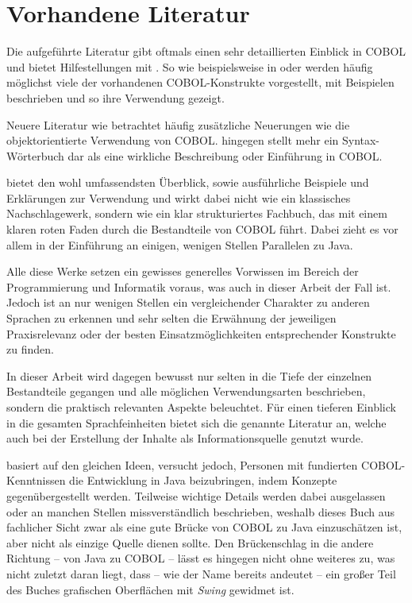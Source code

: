\section{Vorhandene Literatur}
Die aufgeführte Literatur gibt oftmals einen sehr detaillierten Einblick in COBOL und bietet Hilfestellungen mit . So wie beispielsweise in  oder  werden häufig möglichst viele der vorhandenen COBOL-Konstrukte vorgestellt, mit Beispielen beschrieben und so ihre Verwendung gezeigt. 

Neuere Literatur wie  betrachtet häufig zusätzliche Neuerungen wie die objektorientierte Verwendung von COBOL.  
hingegen stellt mehr ein Syntax-Wörterbuch dar als eine wirkliche Beschreibung oder Einführung in COBOL.

 bietet den wohl umfassendsten Überblick, sowie ausführliche Beispiele und Erklärungen zur Verwendung und wirkt dabei nicht wie ein klassisches Nachschlagewerk, sondern wie ein klar strukturiertes Fachbuch, das mit einem klaren roten Faden durch die Bestandteile von COBOL führt. Dabei zieht es vor allem in der Einführung an einigen, wenigen Stellen Parallelen zu Java. 

Alle diese Werke setzen ein gewisses generelles Vorwissen im Bereich der Programmierung und Informatik voraus, was auch in dieser Arbeit der Fall ist. Jedoch ist an nur wenigen Stellen ein vergleichender Charakter zu anderen Sprachen zu erkennen und sehr selten die Erwähnung der jeweiligen Praxisrelevanz oder der besten Einsatzmöglichkeiten entsprechender Konstrukte zu finden. 

In dieser Arbeit wird dagegen bewusst nur selten in die Tiefe der einzelnen Bestandteile gegangen und alle möglichen Verwendungsarten beschrieben, sondern die praktisch relevanten Aspekte beleuchtet. Für einen tieferen Einblick in die gesamten Sprachfeinheiten bietet sich die genannte Literatur an, welche auch bei der Erstellung der Inhalte als Informationsquelle genutzt wurde.

 basiert auf den gleichen Ideen, versucht jedoch, Personen mit fundierten COBOL-Kenntnissen die Entwicklung in Java beizubringen, indem Konzepte gegenübergestellt werden. Teilweise wichtige Details werden dabei ausgelassen oder an manchen Stellen missverständlich beschrieben, weshalb dieses Buch aus fachlicher Sicht zwar als eine gute Brücke von COBOL zu Java einzuschätzen ist, aber nicht als einzige Quelle dienen sollte. Den Brückenschlag in die andere Richtung -- von Java zu COBOL -- lässt es hingegen nicht ohne weiteres zu, was nicht zuletzt daran liegt, dass -- wie der Name bereits andeutet -- ein großer Teil des Buches grafischen Oberflächen mit \textit{Swing} gewidmet ist.

